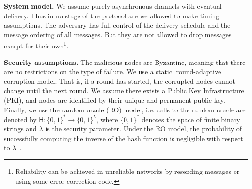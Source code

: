 \textbf{System model.}
We assume purely asynchronous channels with eventual delivery.
Thus in no stage of the protocol are we allowed to make timing assumptions.
The adversary has full control of the delivery schedule and the message ordering of all messages.
But they are not allowed to drop messages except for their own\footnote{Reliability can be achieved in unreliable networks by resending messages or using some error correction code.}.

\textbf{Security assumptions.}
The malicious nodes are Byzantine,
meaning that there are no restrictions on the type of failure.
We use a static, round-adaptive corruption model.
That is, if a round has started, the corrupted nodes cannot change until the next round.
We assume there exists a Public Key Infrastructure (PKI), and nodes are identified by their unique and permanent public key.
Finally, we use the random oracle (RO) model, i.e. calls to the random oracle are denoted by $\textsf{H}: \{0, 1\}^* \rightarrow \{0, 1\}^\lambda$,
where $\{0, 1\}^*$ denotes the space of finite binary strings and $\lambda$ is the security parameter.
Under the RO model, the probability of successfully computing the inverse of the hash function is negligible with respect to $\lambda$~\cite{bellare1993random}.

